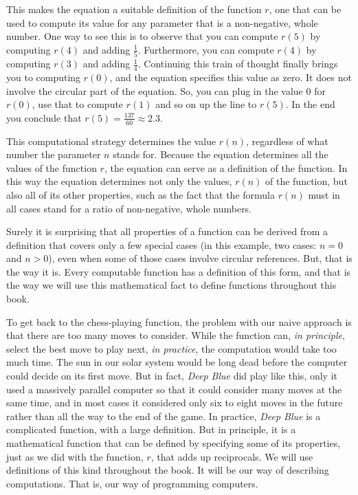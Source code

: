 This makes the equation a suitable definition of the function $r$,
one that can be used to compute its value for any parameter
that is a non-negative, whole number.
One way to see this is to observe that you can compute
$r(5)$ by computing $r(4)$ and adding $\frac{1}{5}$.
Furthermore, you can compute $r(4)$ by computing
$r(3)$ and adding $\frac{1}{4}$.
Continuing this train of thought finally brings you to
computing $r(0)$, and the equation specifies this value as zero.
It does not involve the circular part of the equation.
So, you can plug in the value $0$ for $r(0)$, use that to compute
$r(1)$ and so on up the line to $r(5)$.
In the end you conclude that
$r(5) = \frac{137}{60} \approx 2.3$.

This computational strategy determines the value $r(n)$,
regardless of what number the parameter $n$ stands for.
Because the equation determines all the values of the
function $r$, the equation can serve as a definition
of the function.
In this way the equation determines not only the values,
$r(n)$ of the function, but also all of its other
properties, such as the fact that the formula $r(n)$
must in all cases stand for a ratio of non-negative, whole numbers.

Surely it is surprising that all properties of a function can be
derived from a definition that covers only a few special cases
(in this example, two cases: $n = 0$ and $n > 0$), even when
some of those cases involve circular references.
But, that is the way it is.
Every computable function has a definition of this form, and
that is the way we will use this mathematical fact
to define functions throughout this book.

To get back to the chess-playing function, the problem with our
naive approach is that there are
too many moves to consider.  While the function can, \emph{in principle},
select the best move to play next, \emph{in practice}, the computation
would take too much time.
The sun in our solar system would be long dead
before the computer could decide on its first move.
But in fact, \textit{Deep Blue}
did play like this, only it used a massively parallel computer so that
it could consider many moves at the same time, and in most cases it
considered only six to eight moves in the future rather than
all the way to the end of the game.
In practice,
\textit{Deep Blue} is a complicated function, with a large
definition.  But in principle, it is a mathematical function
that can be defined by specifying some of its properties,
just as we did with the function, $r$, that adds up reciprocals.
We will use definitions of this kind throughout the book.
It will be our way of describing computations.
That is, our way of programming computers.

